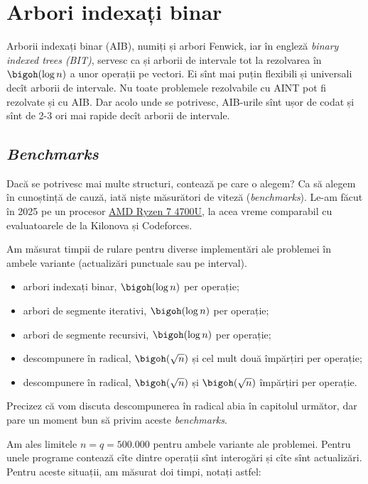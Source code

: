 \chapter{Arbori indexați binar}

Arborii indexați binar (AIB), numiți și arbori Fenwick, iar în engleză \textit{binary indexed trees (BIT)}, servesc ca și arborii de intervale tot la rezolvarea în $\bigoh(\log n)$ a unor operații pe vectori. Ei sînt mai puțin flexibili și universali decît arborii de intervale. Nu toate problemele rezolvabile cu AINT pot fi rezolvate și cu AIB. Dar acolo unde se potrivesc, AIB-urile sînt ușor de codat și sînt de 2-3 ori mai rapide decît arborii de intervale.

\section{\textit{Benchmarks}}

Dacă se potrivesc mai multe structuri, contează pe care o alegem? Ca să alegem în cunoștință de cauză, iată niște măsurători de viteză (\textit{benchmarks}). Le-am făcut în 2025 pe un procesor \href{https://www.cpubenchmark.net/cpu.php?cpu=AMD+Ryzen+7+4700U}{AMD Ryzen 7 4700U}, la acea vreme comparabil cu evaluatoarele de la Kilonova și Codeforces.

Am măsurat timpii de rulare pentru diverse implementări ale problemei în ambele variante (actualizări punctuale sau pe interval).

\begin{itemize}
  \item arbori indexați binar, $\bigoh(\log n)$ per operație;
  \item arbori de segmente iterativi, $\bigoh(\log n)$ per operație;
  \item arbori de segmente recursivi, $\bigoh(\log n)$ per operație;
  \item descompunere în radical, $\bigoh(\sqrt{n})$ și cel mult două împărțiri per operație;
  \item descompunere în radical, $\bigoh(\sqrt{n})$ și $\bigoh(\sqrt{n})$ împărțiri per operație.
\end{itemize}

Precizez că vom discuta descompunerea în radical abia în capitolul următor, dar pare un moment bun să privim aceste \textit{benchmarks}.

Am ales limitele $n = q = 500.000$ pentru ambele variante ale problemei. Pentru unele programe contează cîte dintre operații sînt interogări și cîte sînt actualizări. Pentru aceste situații, am măsurat doi timpi, notați astfel:

